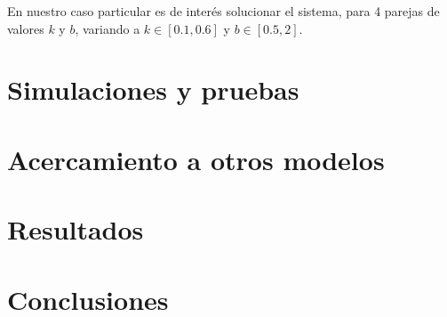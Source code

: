 \documentclass[journal]{IEEEtran}
\begin{document}
En nuestro caso particular es de interés solucionar el sistema, para 4 parejas de valores $k$ y $b$, variando a 
$k \in [0.1, 0.6]$ y $b \in [0.5, 2]$.


\section{Simulaciones y pruebas}


\section{Acercamiento a otros modelos}







\section{Resultados}







\section{Conclusiones}



\ifCLASSOPTIONcaptionsoff
  \newpage
\fi
\end{document}
